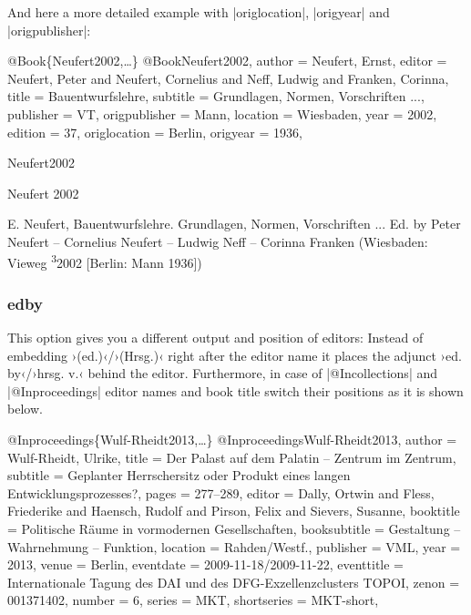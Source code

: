 \documentclass[a4paper,
10pt,
greek,
french,
spanish,
italian,
ngerman,
english,
]{ltxdoc}
\begin{document}
And here a more detailed example with |origlocation|, |origyear| and |origpublisher|:
\begin{bibexample}[label=Neufert2002]{{@}Book\{Neufert2002,…\}}
@Book{Neufert2002,
  author       = {Neufert, Ernst},
  editor       = {Neufert, Peter and Neufert, Cornelius and Neff, Ludwig and Franken, Corinna},
  title        = {Bauentwurfslehre},
  subtitle     = {Grundlagen, Normen, Vorschriften ...},
  publisher    = VT, %
  origpublisher = {Mann},
  location     = {Wiesbaden},
  year         = {2002},
  edition      = {37},
  origlocation = Berlin, %
  origyear     = {1936},
}
\end{bibexample}
 

\begin{bibbox}{Neufert2002}\footnotesize
\parbox[t]{1.7cm}{Neufert  2002} \parbox[t]{9.4cm}{%
E. Neufert, Bauentwurfslehre. Grundlagen, Normen, Vorschriften ... Ed. by Peter Neufert – Cornelius Neufert – Ludwig Neff  – Corinna Franken {\color{red} (Wiesbaden: Vieweg \textsuperscript{3}2002 [Berlin: Mann 1936])}}
\end{bibbox}
 
\subsubsection{edby}\label{edby}
This option gives you a different output and position of editors: 
Instead of embedding ›(ed.)‹/›(Hrsg.)‹ right after the editor name
 it places the adjunct ›ed. by‹/›hrsg. v.‹ behind the editor. 
 Furthermore, in case of |@Incollections| and |@Inproceedings| editor names and book title switch their positions as it is shown below.

\begin{bibexample}[label=Wulf-Rheidt2013]{{@}Inproceedings\{Wulf-Rheidt2013,…\}}
@Inproceedings{Wulf-Rheidt2013,
  author       = {Wulf-Rheidt, Ulrike},
  title        = {Der Palast auf dem Palatin -- Zentrum im Zentrum},
  subtitle     = {Geplanter Herrschersitz oder Produkt eines langen Entwicklungsprozesses?},
  pages        = {277--289},
  editor       = {Dally, Ortwin and Fless, Friederike and Haensch, Rudolf and Pirson, Felix and Sievers, Susanne},
  booktitle    = {Politische Räume in vormodernen Gesellschaften},
  booksubtitle = {Gestaltung – Wahrnehmung – Funktion},
  location     = {Rahden/Westf\adddot},
  publisher    = VML,    %
  year         = {2013},
  venue        = Berlin,   %
  eventdate    = {2009-11-18/2009-11-22},
  eventtitle   = {Internationale Tagung des DAI und des DFG-Exzellenzclusters TOPOI},
  zenon       = {001371402},
  number       = {6},
  series       = MKT,    %
  shortseries  = MKT-short,  %
}
\end{bibexample}
\end{document}
